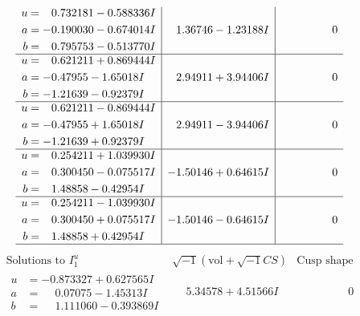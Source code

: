 \documentclass[1p]{elsarticle_modified}
\theoremstyle{definition}
\newcommand{\I}{\sqrt{-1}}
\begin{document}
$$\begin{array}{c|c|c}
\begin{aligned}
u &= \phantom{-}0.732181 - 0.588336 I \\
a &= -0.190030 - 0.674014 I \\
b &= \phantom{-}0.795753 - 0.513770 I\end{aligned}
 & \phantom{-}1.36746 - 1.23188 I & \phantom{-0.000000 } 0 \\ \hline\begin{aligned}
u &= \phantom{-}0.621211 + 0.869444 I \\
a &= -0.47955 - 1.65018 I \\
b &= -1.21639 - 0.92379 I\end{aligned}
 & \phantom{-}2.94911 + 3.94406 I & \phantom{-0.000000 } 0 \\ \hline\begin{aligned}
u &= \phantom{-}0.621211 - 0.869444 I \\
a &= -0.47955 + 1.65018 I \\
b &= -1.21639 + 0.92379 I\end{aligned}
 & \phantom{-}2.94911 - 3.94406 I & \phantom{-0.000000 } 0 \\ \hline\begin{aligned}
u &= \phantom{-}0.254211 + 1.039930 I \\
a &= \phantom{-}0.300450 - 0.075517 I \\
b &= \phantom{-}1.48858 - 0.42954 I\end{aligned}
 & -1.50146 + 0.64615 I & \phantom{-0.000000 } 0 \\ \hline\begin{aligned}
u &= \phantom{-}0.254211 - 1.039930 I \\
a &= \phantom{-}0.300450 + 0.075517 I \\
b &= \phantom{-}1.48858 + 0.42954 I\end{aligned}
 & -1.50146 - 0.64615 I & \phantom{-0.000000 } 0\\
 \hline 
 \end{array}$$\newpage$$\begin{array}{c|c|c}  
\text{Solutions to }I^u_{1}& \I (\text{vol} + \sqrt{-1}CS) & \text{Cusp shape}\\
 \hline 
\begin{aligned}
u &= -0.873327 + 0.627565 I \\
a &= \phantom{-}0.07075 - 1.45313 I \\
b &= \phantom{-}1.111060 - 0.393869 I\end{aligned}
 & \phantom{-}5.34578 + 4.51566 I & \phantom{-0.000000 } 0 \\ \hline\begin{aligned}

\end{aligned}
\end{array}$$
\end{document}
